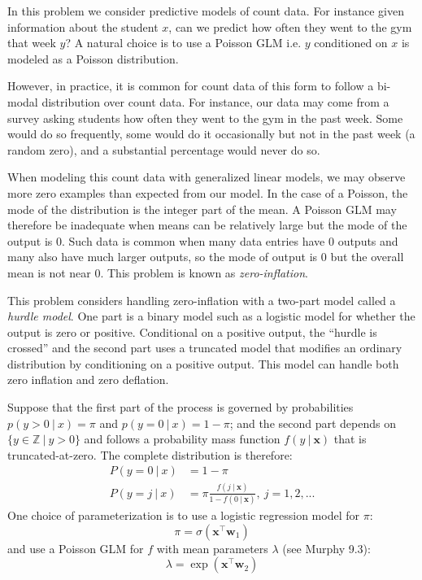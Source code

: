 \begin{problem}

  In this problem we consider predictive models of count data. For
  instance given information about the student $x$, can we predict how
  often they went to the gym that week $y$? A natural choice is to use a Poisson GLM
  i.e. $y$ conditioned on $x$ is modeled as a Poisson distribution.

  However, in practice, it is common for count data of this form to
  follow a bi-modal distribution over count data. For instance, our
  data may come from a survey asking students how often they went to
  the gym in the past week. Some would do so frequently, some would do
  it occasionally but not in the past week (a random zero), and a
  substantial percentage would never do so.

  When modeling this count data with generalized linear models, we
  may observe more zero examples than expected from our model.
  In the case of a Poisson, the mode of the distribution is the
  integer part of the mean. A Poisson GLM may therefore be inadequate
  when means can be relatively large but the mode of the output is 0. Such data is
  common when many data entries have 0 outputs and many also have much
  larger outputs, so the mode of output is 0 but the overall mean is
  not near 0. This problem is known as \textit{zero-inflation}.

  This problem considers handling zero-inflation with a two-part model called
  a \textit{hurdle model}. One part is a binary model such as a logistic model
  for whether the output is zero or positive. Conditional on a positive output,
  the ``hurdle is crossed'' and the second part uses a truncated model that
  modifies an ordinary distribution by conditioning on a positive
  output. This model can handle both zero inflation and zero
  deflation.

  Suppose that the first part of the process is governed by
  probabilities $p(y > 0\ |\ x) = \pi $ and $p(y = 0\ | \ x) = 1 - \pi$; and the second part
  depends on  $\{y\in \mathbb{Z} \ |\ y > 0\}$ and follows a probability mass
  function $f(y\ |\ \mathbf{x})$ that is truncated-at-zero. The
  complete distribution is therefore:
\begin{align*}
P(y = 0\ |\ x) & = 1- \pi\\
P(y = j\ |\ x) & = \pi \frac{f(j\ |\ \mathbf{x})}{1 - f(0\ | \ \mathbf{x})},\ j=1,2,...
\end{align*}
One choice of parameterization is to use a logistic regression model
for $\pi$: $$\pi = \sigma(\mathbf{x}^\top \mathbf{w}_1)$$ and use a Poisson GLM for $f$ with mean parameters $\lambda$ (see
Murphy 9.3): $$\lambda = \exp(\mathbf{x}^\top \mathbf{w}_2) $$


\end{problem}
